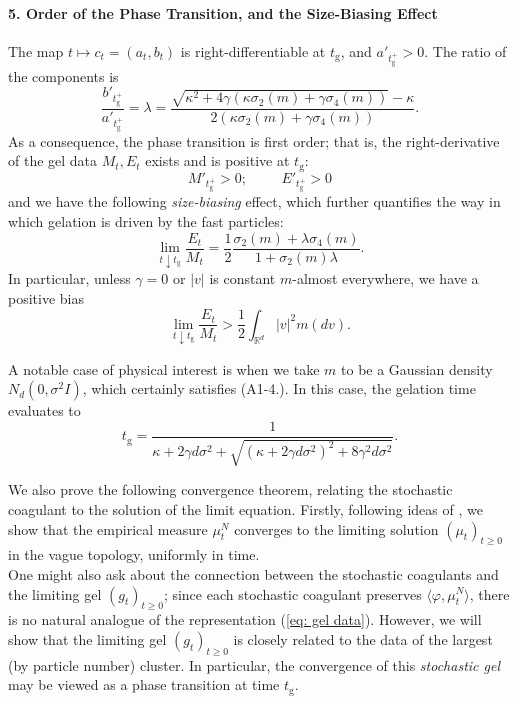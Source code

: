 \begin{theorem}
\paragraph{5. Order of the Phase Transition, and the Size-Biasing Effect} The map $t\mapsto c_t=(a_t,b_t)$ is right-differentiable at $t_\mathrm{g}$, and $a'_{t_\mathrm{g}^+}>0$. The ratio of the components is \begin{equation} \frac{b'_{t_\mathrm{g}^+}}{a'_{t_\mathrm{g}^+}}=\lambda =\frac{\sqrt{\kappa^2+4\gamma(\kappa\sigma_2(m)+\gamma \sigma_4(m))}-\kappa}{2(\kappa\sigma_2(m)+\gamma\sigma_4(m))}.\end{equation} As a consequence, the phase transition is first order; that is, the right-derivative of the gel data $M_t, E_t$ exists and is positive at $t_\mathrm{g}$: \begin{equation}M'_{t_\mathrm{g}^+}>0; \hspace{1cm} E'_{t_\mathrm{g}^+}>0 \end{equation} and we have the following \emph{size-biasing} effect, which further quantifies the way in which gelation is driven by the fast particles:  \begin{equation}
    \lim_{t\downarrow t_\mathrm{g}}\frac{E_t}{M_t}=\frac{1}{2}\frac{\sigma_2(m)+\lambda\sigma_4(m)}{1+\sigma_2(m)\lambda}.
\end{equation} In particular, unless $\gamma=0$ or $|v|$ is constant $m$-almost everywhere, we have a positive bias \begin{equation}
    \lim_{t\downarrow t_\mathrm{g}}\frac{E_t}{M_t}>\frac{1}{2}\int_{\mathbb{R}^d}|v|^2m(dv).
\end{equation}

A notable case of physical interest is when we take $m$ to be a Gaussian density $N_d(0, \sigma^2 I)$, which certainly satisfies (A1-4.). In this case, the gelation time evaluates to
\begin{equation}
    \label{eq: formula of tgel} t_\mathrm{g} = \frac{1}{\kappa+2\gamma d \sigma^2+
    \sqrt{(\kappa+2\gamma d \sigma^2)^2+8\gamma^2 d \sigma^2}}.
\end{equation} \end{theorem}
We also prove the following convergence theorem, relating the stochastic coagulant to the solution of the limit equation. Firstly, following ideas of \cite{N00}, we show that the empirical measure $\mu^N_t$ converges to the limiting solution $(\mu_t)_{t\ge 0}$ in the vague topology, uniformly in time. \medskip \\ One might also ask about the connection between the stochastic coagulants and the limiting gel $(g_t)_{t\ge 0}$; since each stochastic coagulant preserves $\langle \varphi, \mu^N_t\rangle$, there is no natural analogue of the representation (\ref{eq: gel data}). However, we will show that the limiting gel $(g_t)_{t\ge 0}$ is closely related to the data of the largest (by particle number) cluster. In particular, the convergence of this \emph{stochastic gel} may be viewed as a phase transition at time $t_\mathrm{g}$.
